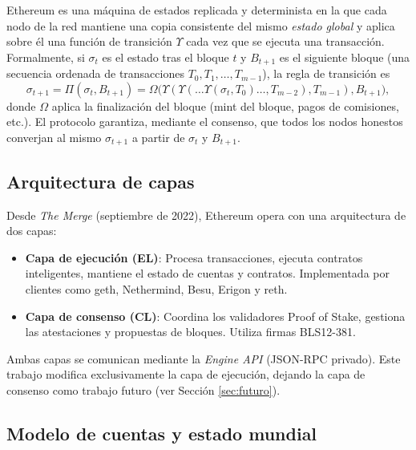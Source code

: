 Ethereum \parencite{buterin2014ethereum,wood2014ethereum} es una máquina de estados replicada y determinista en la que cada nodo de la red mantiene una copia consistente del mismo \emph{estado global} y aplica sobre él una función de transición $\Upsilon$ cada vez que se ejecuta una transacción. Formalmente, si $\sigma_t$ es el estado tras el bloque $t$ y $B_{t+1}$ es el siguiente bloque (una secuencia ordenada de transacciones $T_0, T_1, \ldots, T_{m-1}$), la regla de transición es
\begin{equation}
  \sigma_{t+1} = \Pi(\sigma_t, B_{t+1}) = \Omega\bigl(\Upsilon(\Upsilon(\ldots \Upsilon(\sigma_t, T_0) \ldots, T_{m-2}), T_{m-1}), B_{t+1}\bigr),
  \label{eq:eth_state_transition}
\end{equation}
donde $\Omega$ aplica la finalización del bloque (mint del bloque, pagos de comisiones, etc.). El protocolo garantiza, mediante el consenso, que todos los nodos honestos converjan al mismo $\sigma_{t+1}$ a partir de $\sigma_t$ y $B_{t+1}$.

\subsection{Arquitectura de capas}

Desde \emph{The Merge} (septiembre de 2022), Ethereum opera con una arquitectura de dos capas:

\begin{itemize}
  \item \textbf{Capa de ejecución (EL)}: Procesa transacciones, ejecuta contratos inteligentes, mantiene el estado de cuentas y contratos. Implementada por clientes como geth, Nethermind, Besu, Erigon y reth.
  
  \item \textbf{Capa de consenso (CL)}: Coordina los validadores Proof of Stake, gestiona las atestaciones y propuestas de bloques. Utiliza firmas BLS12-381.
\end{itemize}

Ambas capas se comunican mediante la \emph{Engine API} (JSON-RPC privado). Este trabajo modifica exclusivamente la capa de ejecución, dejando la capa de consenso como trabajo futuro (ver Sección \ref{sec:futuro}).

\subsection{Modelo de cuentas y estado mundial}
\label{sec:eth_accounts}

